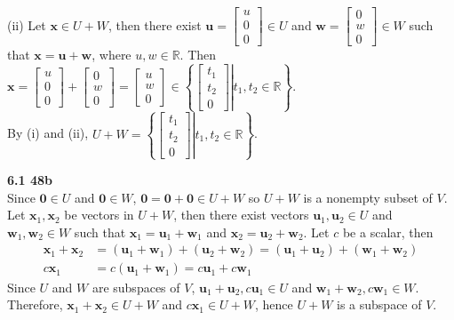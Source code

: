 (ii) Let $\textbf{x} \in U + W$, then there exist $\textbf{u} = \begin{bmatrix}
	u \\ 0 \\ 0
\end{bmatrix} \in U$ and $\textbf{w} = \begin{bmatrix}
	0 \\ w \\ 0
\end{bmatrix} \in W$ such that $\textbf{x} = \textbf{u} + \textbf{w}$, where $u, w \in \mathbb{R}$. Then $\textbf{x} = \begin{bmatrix}
	u \\ 0 \\ 0
\end{bmatrix} + \begin{bmatrix}
	0 \\ w \\ 0
\end{bmatrix} = \begin{bmatrix}
	u \\ w \\ 0
\end{bmatrix} \in \left\lbrace\left.\begin{bmatrix}
	t_1 \\ t_2 \\ 0
\end{bmatrix} \right\vert t_1, t_2 \in \mathbb{R} \right\rbrace$. \\

By (i) and (ii), $U + W = \left\lbrace\left.\begin{bmatrix}
	t_1 \\ t_2 \\ 0
\end{bmatrix} \right\vert t_1, t_2 \in \mathbb{R} \right\rbrace$.

\textbf{6.1 48b} \\
Since $\textbf{0} \in U$ and $\textbf{0} \in  W$, $\textbf{0} = \textbf{0} + \textbf{0} \in U + W$ so $U + W$ is a nonempty subset of $V$. \\

Let $\textbf{x}_1, \textbf{x}_2$ be vectors in $U + W$, then there exist vectors $\textbf{u}_1, \textbf{u}_2 \in U$ and $\textbf{w}_1, \textbf{w}_2 \in W$ such that $\textbf{x}_1 = \textbf{u}_1 + \textbf{w}_1$ and $\textbf{x}_2 = \textbf{u}_2 + \textbf{w}_2$. Let $c$ be a scalar, then \begin{align*}
	\textbf{x}_1 + \textbf{x}_2 &= (\textbf{u}_1 + \textbf{w}_1) + (\textbf{u}_2 + \textbf{w}_2) = (\textbf{u}_1 + \textbf{u}_2) + (\textbf{w}_1 + \textbf{w}_2) \\
	c\textbf{x}_1 &= c(\textbf{u}_1 + \textbf{w}_1) = c\textbf{u}_1 + c\textbf{w}_1
\end{align*} Since $U$ and $W$ are subspaces of $V$, $\textbf{u}_1 + \textbf{u}_2, c\textbf{u}_1 \in U$ and $\textbf{w}_1 + \textbf{w}_2, c\textbf{w}_1 \in W$. Therefore, $\textbf{x}_1 + \textbf{x}_2 \in U + W$ and $c\textbf{x}_1 \in U + W$, hence $U + W$ is a subspace of $V$. \\

